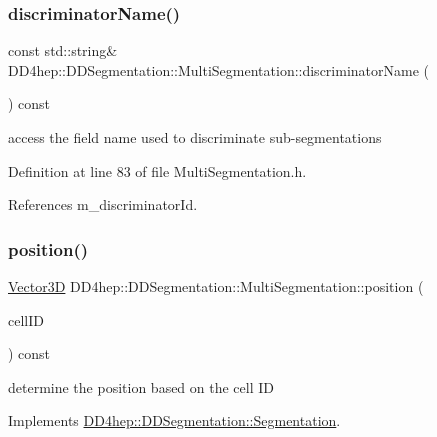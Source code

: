 \subsubsection{\texorpdfstring{discriminator\+Name()}{discriminatorName()}}
{\footnotesize\ttfamily const std\+::string\& D\+D4hep\+::\+D\+D\+Segmentation\+::\+Multi\+Segmentation\+::discriminator\+Name (\begin{DoxyParamCaption}{ }\end{DoxyParamCaption}) const\hspace{0.3cm}{\ttfamily [inline]}}



access the field name used to discriminate sub-\/segmentations 



Definition at line 83 of file Multi\+Segmentation.\+h.



References m\+\_\+discriminator\+Id.

\hypertarget{class_d_d4hep_1_1_d_d_segmentation_1_1_multi_segmentation_a45377b4442211346de8bea2edfeb1bf4}{}\label{class_d_d4hep_1_1_d_d_segmentation_1_1_multi_segmentation_a45377b4442211346de8bea2edfeb1bf4} 
\subsubsection{\texorpdfstring{position()}{position()}}
{\footnotesize\ttfamily \hyperlink{struct_d_d4hep_1_1_d_d_segmentation_1_1_vector3_d}{Vector3D} D\+D4hep\+::\+D\+D\+Segmentation\+::\+Multi\+Segmentation\+::position (\begin{DoxyParamCaption}\item[{const \hyperlink{namespace_d_d4hep_1_1_d_d_segmentation_ac7af071d85cb48820914434a07e21ba1}{Cell\+ID} \&}]{cell\+ID }\end{DoxyParamCaption}) const\hspace{0.3cm}{\ttfamily [virtual]}}



determine the position based on the cell ID 



Implements \hyperlink{class_d_d4hep_1_1_d_d_segmentation_1_1_segmentation_a594fe6d78667415855858d083b64acad}{D\+D4hep\+::\+D\+D\+Segmentation\+::\+Segmentation}.



